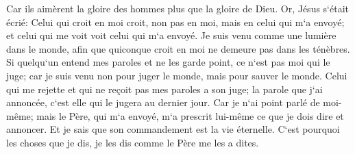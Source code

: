 \verse Car ils aimèrent la gloire des hommes plus que la gloire de Dieu. 
\verse Or, Jésus s`était écrié: Celui qui croit en moi croit, non pas en moi, mais en celui qui m`a envoyé; 
\verse et celui qui me voit voit celui qui m`a envoyé. 
\verse Je suis venu comme une lumière dans le monde, afin que quiconque croit en moi ne demeure pas dans les ténèbres. 
\verse Si quelqu`un entend mes paroles et ne les garde point, ce n`est pas moi qui le juge; car je suis venu non pour juger le monde, mais pour sauver le monde. 
\verse Celui qui me rejette et qui ne reçoit pas mes paroles a son juge; la parole que j`ai annoncée, c`est elle qui le jugera au dernier jour. 
\verse Car je n`ai point parlé de moi-même; mais le Père, qui m`a envoyé, m`a prescrit lui-même ce que je dois dire et annoncer. 
\verse Et je sais que son commandement est la vie éternelle. C`est pourquoi les choses que je dis, je les dis comme le Père me les a dites. 

\chapter{}

